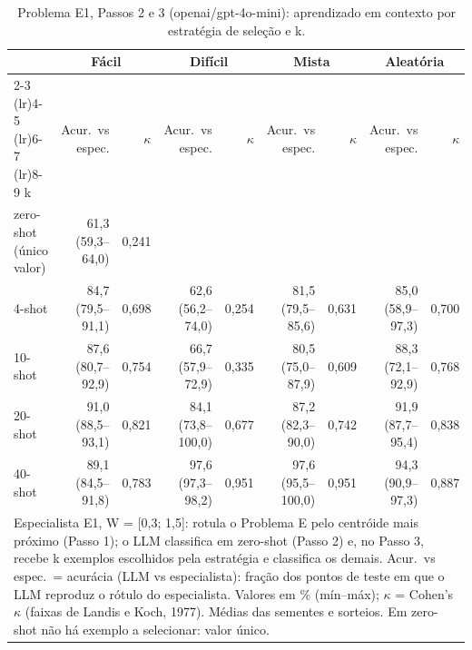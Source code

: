 \begin{table}[htbp]
\centering
\small
\caption{Problema E1, Passos 2 e 3 (openai/gpt-4o-mini): aprendizado em contexto por estratégia de seleção e k.}
\label{tab:bloco2_E1_passo3_estrategia_x_k_gpt4mini}
\begin{tabular}{lrrrrrrrr}
\toprule
 & \multicolumn{2}{c}{Fácil} & \multicolumn{2}{c}{Difícil} & \multicolumn{2}{c}{Mista} & \multicolumn{2}{c}{Aleatória} \\ \cmidrule(lr){2-3} \cmidrule(lr){4-5} \cmidrule(lr){6-7} \cmidrule(lr){8-9}
k & Acur.\ vs espec. & $\kappa$ & Acur.\ vs espec. & $\kappa$ & Acur.\ vs espec. & $\kappa$ & Acur.\ vs espec. & $\kappa$ \\
\midrule
zero-shot (único valor) & 61,3 (59,3–64,0) & 0,241 &  &  &  &  &  &  \\
4-shot & 84,7 (79,5–91,1) & 0,698 & 62,6 (56,2–74,0) & 0,254 & 81,5 (79,5–85,6) & 0,631 & 85,0 (58,9–97,3) & 0,700 \\
10-shot & 87,6 (80,7–92,9) & 0,754 & 66,7 (57,9–72,9) & 0,335 & 80,5 (75,0–87,9) & 0,609 & 88,3 (72,1–92,9) & 0,768 \\
20-shot & 91,0 (88,5–93,1) & 0,821 & 84,1 (73,8–100,0) & 0,677 & 87,2 (82,3–90,0) & 0,742 & 91,9 (87,7–95,4) & 0,838 \\
40-shot & 89,1 (84,5–91,8) & 0,783 & 97,6 (97,3–98,2) & 0,951 & 97,6 (95,5–100,0) & 0,951 & 94,3 (90,9–97,3) & 0,887 \\
\bottomrule
\multicolumn{9}{p{0.95\linewidth}}{\footnotesize Especialista E1, W = [0,3; 1,5]: rotula o Problema E pelo centróide mais próximo (Passo 1); o LLM classifica em zero-shot (Passo 2) e, no Passo 3, recebe k exemplos escolhidos pela estratégia e classifica os demais. Acur.\ vs espec.\ = acurácia (LLM vs especialista): fração dos pontos de teste em que o LLM reproduz o rótulo do especialista. Valores em \% (mín–máx); $\kappa$ = Cohen's $\kappa$ (faixas de Landis e Koch, 1977). Médias das sementes e sorteios. Em zero-shot não há exemplo a selecionar: valor único.} \\
\end{tabular}
\end{table}
